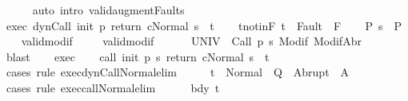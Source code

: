 \begin{isabellebody}
\ \ \ \ \isamarkupfalse%
\ {\isacharparenleft}auto\ intro{\isacharcolon}\ valid{\isacharunderscore}augment{\isacharunderscore}Faults{\isacharparenright}\isanewline
\ \ \isamarkupfalse%
\ exec{\isacharcolon}\ {\isachardoublequoteopen}{\isasymGamma}{\isasymturnstile}{\isasymlangle}dynCall\ init\ p\ return\ c{\isacharcomma}Normal\ s{\isasymrangle}\ {\isasymRightarrow}\ t{\isachardoublequoteclose}\isanewline
\ \ \isamarkupfalse%
\ t{\isacharunderscore}notin{\isacharunderscore}F{\isacharcolon}\ {\isachardoublequoteopen}t\ {\isasymnotin}\ Fault\ {\isacharbackquote}\ F{\isachardoublequoteclose}\isanewline
\ \ \isamarkupfalse%
\ P{\isacharcolon}\ {\isachardoublequoteopen}s\ {\isasymin}\ P{\isachardoublequoteclose}\isanewline
\ \ \isamarkupfalse%
\ valid{\isacharunderscore}modif\ \isanewline
\ \ \isamarkupfalse%
\ valid{\isacharunderscore}modif{\isacharprime}{\isacharcolon}\ \isanewline
\ \ \ \ {\isachardoublequoteopen}{\isasymforall}{\isasymsigma}{\isachardot}\ {\isasymGamma}{\isacharcomma}{\isasymTheta}{\isasymTurnstile}\isactrlbsub {\isacharslash}UNIV\isactrlesub \ {\isacharbraceleft}{\isasymsigma}{\isacharbraceright}\ {\isacharparenleft}Call\ {\isacharparenleft}p\ s{\isacharparenright}{\isacharparenright}\ {\isacharparenleft}Modif\ {\isasymsigma}{\isacharparenright}{\isacharcomma}{\isacharparenleft}ModifAbr\ {\isasymsigma}{\isacharparenright}{\isachardoublequoteclose}\isanewline
\ \ \ \ \isamarkupfalse%
\ blast\isanewline
\ \ \isamarkupfalse%
\ exec\isanewline
\ \ \isamarkupfalse%
\ {\isachardoublequoteopen}{\isasymGamma}{\isasymturnstile}{\isasymlangle}call\ init\ {\isacharparenleft}p\ s{\isacharparenright}\ return\ c{\isacharcomma}Normal\ s{\isasymrangle}\ {\isasymRightarrow}\ t{\isachardoublequoteclose}\isanewline
\ \ \ \ \isamarkupfalse%
\ {\isacharparenleft}cases\ rule{\isacharcolon}\ exec{\isacharunderscore}dynCall{\isacharunderscore}Normal{\isacharunderscore}elim{\isacharparenright}\isanewline
\ \ \isamarkupfalse%
\ \isamarkupfalse%
\ {\isachardoublequoteopen}t\ {\isasymin}\ Normal\ {\isacharbackquote}\ Q\ {\isasymunion}\ Abrupt\ {\isacharbackquote}\ A{\isachardoublequoteclose}\isanewline
\ \ \isamarkupfalse%
\ {\isacharparenleft}cases\ rule{\isacharcolon}\ exec{\isacharunderscore}call{\isacharunderscore}Normal{\isacharunderscore}elim{\isacharparenright}\isanewline
\ \ \ \ \isamarkupfalse%
\ bdy\ t{\isacharprime}\isanewline

\end{isabellebody}
